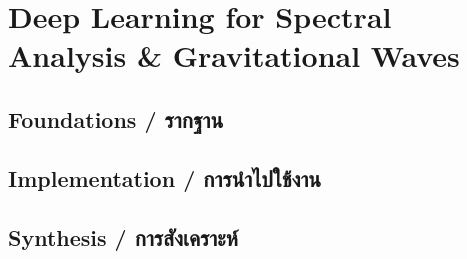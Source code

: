 \chapter{Deep Learning for Spectral Analysis \& Gravitational Waves}
\label{ch:spectral_analysis}

\section{Foundations \quad / \quad \textthai{รากฐาน}}



\section{Implementation \quad / \quad \textthai{การนำไปใช้งาน}}



\section{Synthesis \quad / \quad \textthai{การสังเคราะห์}}



